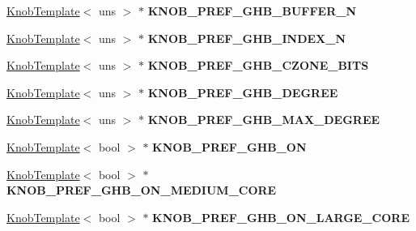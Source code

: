 \begin{DoxyCompactItemize}
\item 
\hypertarget{classall__knobs__c_a46f5e9b1979eca8a69973fd4ed36fd7a}{
\hyperlink{classKnobTemplate}{KnobTemplate}$<$ uns $>$ $\ast$ {\bfseries KNOB\_\-PREF\_\-GHB\_\-BUFFER\_\-N}}
\label{classall__knobs__c_a46f5e9b1979eca8a69973fd4ed36fd7a}

\item 
\hypertarget{classall__knobs__c_af68c3bb5dcecdc408af75673fe0faa0c}{
\hyperlink{classKnobTemplate}{KnobTemplate}$<$ uns $>$ $\ast$ {\bfseries KNOB\_\-PREF\_\-GHB\_\-INDEX\_\-N}}
\label{classall__knobs__c_af68c3bb5dcecdc408af75673fe0faa0c}

\item 
\hypertarget{classall__knobs__c_abefe597841fcf9f8060bc5120663289d}{
\hyperlink{classKnobTemplate}{KnobTemplate}$<$ uns $>$ $\ast$ {\bfseries KNOB\_\-PREF\_\-GHB\_\-CZONE\_\-BITS}}
\label{classall__knobs__c_abefe597841fcf9f8060bc5120663289d}

\item 
\hypertarget{classall__knobs__c_aeaf525a485d3ec0b14c0f1a8dd78a58b}{
\hyperlink{classKnobTemplate}{KnobTemplate}$<$ uns $>$ $\ast$ {\bfseries KNOB\_\-PREF\_\-GHB\_\-DEGREE}}
\label{classall__knobs__c_aeaf525a485d3ec0b14c0f1a8dd78a58b}

\item 
\hypertarget{classall__knobs__c_a869ea9f0c6fbaeadb16919c5481feb0d}{
\hyperlink{classKnobTemplate}{KnobTemplate}$<$ uns $>$ $\ast$ {\bfseries KNOB\_\-PREF\_\-GHB\_\-MAX\_\-DEGREE}}
\label{classall__knobs__c_a869ea9f0c6fbaeadb16919c5481feb0d}

\item 
\hypertarget{classall__knobs__c_a1b236597a98aca5ad24549bd95e588af}{
\hyperlink{classKnobTemplate}{KnobTemplate}$<$ bool $>$ $\ast$ {\bfseries KNOB\_\-PREF\_\-GHB\_\-ON}}
\label{classall__knobs__c_a1b236597a98aca5ad24549bd95e588af}

\item 
\hypertarget{classall__knobs__c_a36ac83a10eef1144b5905156255f379b}{
\hyperlink{classKnobTemplate}{KnobTemplate}$<$ bool $>$ $\ast$ {\bfseries KNOB\_\-PREF\_\-GHB\_\-ON\_\-MEDIUM\_\-CORE}}
\label{classall__knobs__c_a36ac83a10eef1144b5905156255f379b}

\item 
\hypertarget{classall__knobs__c_acf0eb66b0088dd91ae9f3e3280aa2fcf}{
\hyperlink{classKnobTemplate}{KnobTemplate}$<$ bool $>$ $\ast$ {\bfseries KNOB\_\-PREF\_\-GHB\_\-ON\_\-LARGE\_\-CORE}}
\label{classall__knobs__c_acf0eb66b0088dd91ae9f3e3280aa2fcf}


\end{DoxyCompactItemize}
